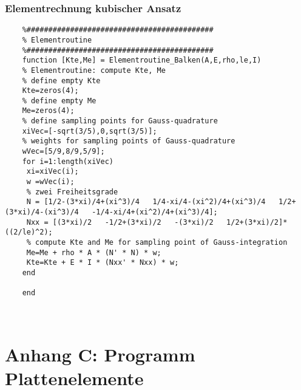	\subsubsection*{Elementrechnung kubischer Ansatz}
	\begin{lstlisting}
	%###########################################
	% Elementroutine
	%###########################################
	function [Kte,Me] = Elementroutine_Balken(A,E,rho,le,I)
	% Elementroutine: compute Kte, Me
	% define empty Kte
	Kte=zeros(4);
	% define empty Me 
	Me=zeros(4);
	% define sampling points for Gauss-quadrature
	xiVec=[-sqrt(3/5),0,sqrt(3/5)]; 
	% weights for sampling points of Gauss-quadrature
	wVec=[5/9,8/9,5/9];            
	for i=1:length(xiVec)
	 xi=xiVec(i);
	 w =wVec(i);
	 % zwei Freiheitsgrade
	 N = [1/2-(3*xi)/4+(xi^3)/4   1/4-xi/4-(xi^2)/4+(xi^3)/4   1/2+(3*xi)/4-(xi^3)/4   -1/4-xi/4+(xi^2)/4+(xi^3)/4];
	 Nxx = [(3*xi)/2   -1/2+(3*xi)/2   -(3*xi)/2   1/2+(3*xi)/2]*((2/le)^2);
	 % compute Kte and Me for sampling point of Gauss-integration
	 Me=Me + rho * A * (N' * N) * w;
	 Kte=Kte + E * I * (Nxx' * Nxx) * w;
	end
	
	end
	\end{lstlisting}
	
	\clearpage
	
	\newpage
	\pagestyle{empty}
	\ \\
	\newpage
	
	\setcounter{page}{1} 
	\pagestyle{fancy}
	\section*{Anhang C: Programm Plattenelemente}

